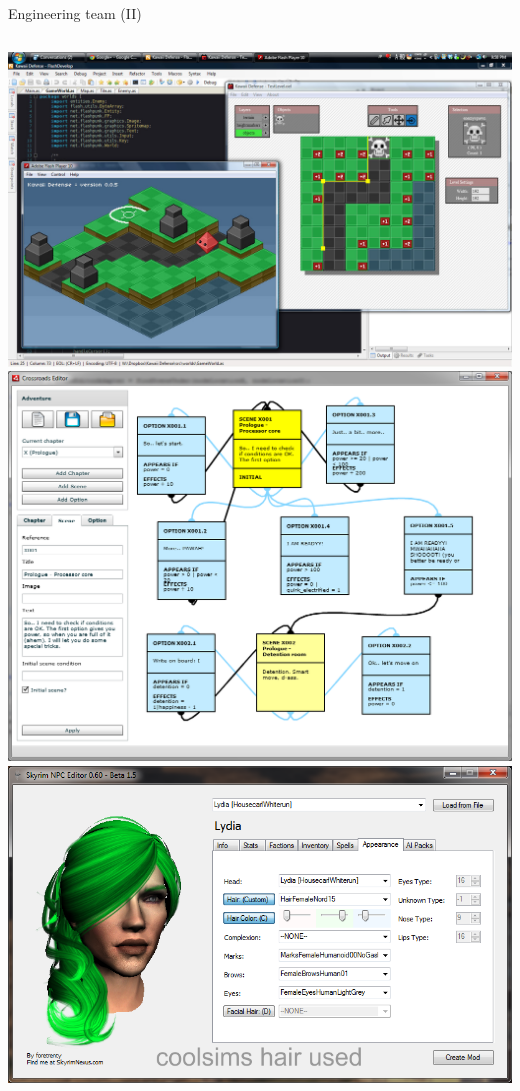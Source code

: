 \documentclass[10pt,compress]{beamer} %
\begin{document}
\begin{frame}[plain]{Engineering team (II)}
    \begin{columns}
		\centering\includegraphics[width=\linewidth]{figs/devscreen2}\\
		\centering\includegraphics[width=\linewidth]{figs/crossroads_editor2}
		\centering\includegraphics[width=\linewidth]{figs/npceditor}\\

\end{columns}
\end{frame}
\end{document}
